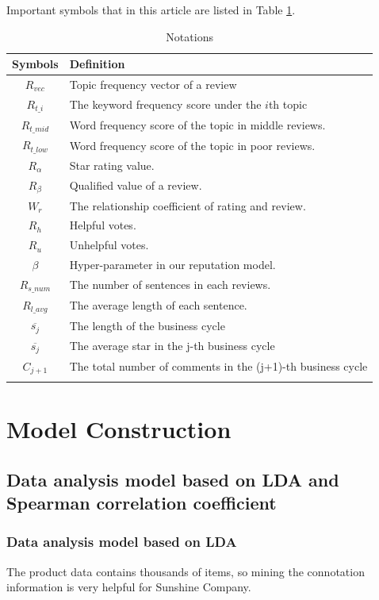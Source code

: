 \documentclass{mcmthesis}
\begin{document}
Important symbols that in this article are listed in Table \ref{notation}.
\begin{table}[H] 
	\caption{Notations} 
	\center
	\begin{tabular}{cp{}}
		\toprule 
		Symbols &Definition  \\ 
		\midrule 
		$R_{vec}$& Topic frequency vector of a review  \\ 
		$R_{t\_i}$ & The keyword frequency score under the $i$th topic \\ 
		$R_{t\_{mid}}$ & Word frequency score of the topic in middle reviews. \\ 
		$R_{t\_{low}}$ & Word frequency score of the topic in poor reviews.\\
		$R_{\alpha}$ & Star rating value.\\
		$R_{\beta}$ & Qualified value of a review.\\
		$W_{r}$  & The relationship coefficient of rating and review.\\
		$R_{h}$ & Helpful votes.\\
		$R_{u}$ & Unhelpful votes.\\
		$\beta$ & Hyper-parameter in our reputation model.\\
		$R_{s\_{num}}$ & The number of sentences in each reviews.\\
		$R_{l\_{avg}}$ & The average length of each sentence.\\
		$\overline{s_j}$ &The length of the business cycle\\
		$\overline{s_j}$ &The average star in the j-th business cycle\\
		$C_{j+1}$	&The total number of comments in the (j+1)-th business cycle \\
		\bottomrule 
		\label{notation}
	\end{tabular} 
\end{table}

\section{Model Construction}
\subsection{Data analysis model based on LDA and Spearman correlation coefficient}
\subsubsection{Data analysis model based on LDA}
The product data contains thousands of items, so mining the connotation information is very helpful for Sunshine Company.
\end{document}
